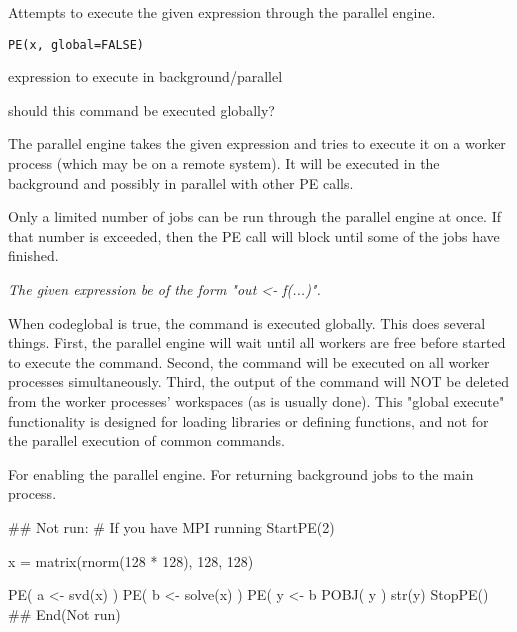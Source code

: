 \documentclass{article}
\begin{document}
\begin{Description}\relax
Attempts to execute the given expression through the parallel engine.
\end{Description}
\begin{Usage}
\begin{verbatim}
PE(x, global=FALSE)
\end{verbatim}
\end{Usage}
\begin{Arguments}
\begin{ldescription}
\item[\code{x}] expression to execute in background/parallel 
\item[\code{global}] should this command be executed globally? 
\end{ldescription}
\end{Arguments}
\begin{Details}\relax
The parallel engine takes the given expression and tries to execute it
on a worker process (which may be on a remote system).  It will be
executed in the background and possibly in parallel with other PE calls.

Only a limited number of jobs can be run through the parallel engine at
once.  If that number is exceeded, then the PE call will block until some
of the jobs have finished.

\emph{The given expression  be of the form "out <- f(...)".}

When code{global} is true, the command is executed globally.  This does
several things.  First, the parallel engine will wait until all workers
are free before started to execute the command.  Second, the command will
be executed on all worker processes simultaneously.  Third, the output of
the command will NOT be deleted from the worker processes' workspaces (as
is usually done).  This "global execute" functionality is designed for
loading libraries or defining functions, and not for the parallel
execution of common commands.
\end{Details}
\begin{SeeAlso}\relax
{}  For enabling the parallel engine.
  For returning background jobs to the main process.
\end{SeeAlso}
\begin{Examples}
\begin{ExampleCode}
## Not run: 
# If you have MPI running
StartPE(2)

x = matrix(rnorm(128 * 128), 128, 128)

PE( a <- svd(x) )
PE( b <- solve(x) )
PE( y <- b %
POBJ( y )
str(y)
StopPE()
## End(Not run)
\end{ExampleCode}
\end{Examples}
\end{document}
